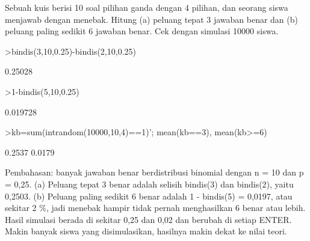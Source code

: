 \documentclass[a4paper,10pt]{article}
\begin{document}
\begin{eulernotebook}
\begin{eulercomment}
\begin{eulercomment}
\begin{eulercomment}
\begin{eulercomment}
\begin{eulercomment}
\begin{eulercomment}
\begin{eulercomment}
\begin{eulercomment}
\begin{eulercomment}
\begin{eulercomment}
\begin{eulercomment}
\begin{eulercomment}
\begin{eulercomment}
\begin{eulercomment}
\begin{eulercomment}
\begin{eulercomment}
\begin{eulercomment}
\begin{eulercomment}
\begin{eulercomment}
\begin{eulercomment}
\begin{eulercomment}
\begin{eulercomment}
\begin{eulercomment}
\begin{eulercomment}
\begin{eulercomment}
\begin{eulercomment}
\begin{eulercomment}
\begin{eulercomment}
\begin{eulercomment}
\begin{eulercomment}
\begin{eulercomment}
\end{eulercomment}
\begin{eulercomment}
Sebuah kuis berisi 10 soal pilihan ganda dengan 4 pilihan, dan seorang siswa menjawab dengan
menebak. Hitung (a) peluang tepat 3 jawaban benar dan (b) peluang paling sedikit 6 jawaban
benar. Cek dengan simulasi 10000 siswa.
\end{eulercomment}
\begin{eulerprompt}
>bindis(3,10,0.25)-bindis(2,10,0.25)
\end{eulerprompt}
\begin{euleroutput}
  0.25028
\end{euleroutput}
\begin{eulerprompt}
>1-bindis(5,10,0.25)
\end{eulerprompt}
\begin{euleroutput}
  0.019728
\end{euleroutput}
\begin{eulerprompt}
>kb=sum(intrandom(10000,10,4)==1)'; mean(kb==3), mean(kb>=6)
\end{eulerprompt}
\begin{euleroutput}
  0.2537
  0.0179
\end{euleroutput}
\begin{eulercomment}
Pembahasan: banyak jawaban benar berdistribusi binomial dengan n = 10 dan p = 0,25.
(a) Peluang tepat 3 benar adalah selisih bindis(3) dan bindis(2), yaitu 0,2503. (b) Peluang
paling sedikit 6 benar adalah 1 - bindis(5) = 0,0197, atau sekitar 2 \%, jadi menebak hampir
tidak pernah menghasilkan 6 benar atau lebih. Hasil simulasi berada di sekitar 0,25 dan 0,02
dan berubah di setiap ENTER. Makin banyak siswa yang disimulasikan, hasilnya makin dekat ke
nilai teori.


\end{eulercomment}
\end{eulercomment}
\end{eulercomment}
\end{eulercomment}
\end{eulercomment}
\end{eulercomment}
\end{eulercomment}
\end{eulercomment}
\end{eulercomment}
\end{eulercomment}
\end{eulercomment}
\end{eulercomment}
\end{eulercomment}
\end{eulercomment}
\end{eulercomment}
\end{eulercomment}
\end{eulercomment}
\end{eulercomment}
\end{eulercomment}
\end{eulercomment}
\end{eulercomment}
\end{eulercomment}
\end{eulercomment}
\end{eulercomment}
\end{eulercomment}
\end{eulercomment}
\end{eulercomment}
\end{eulercomment}
\end{eulercomment}
\end{eulercomment}
\end{eulercomment}
\end{eulernotebook}
\end{document}

